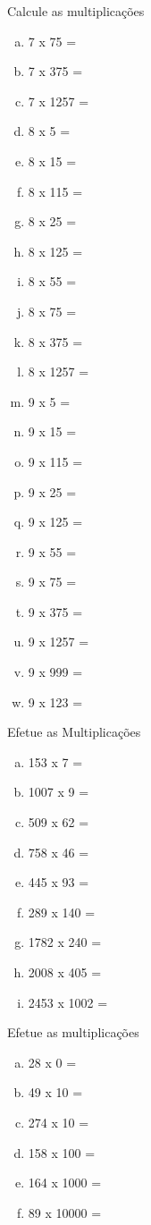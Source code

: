 \item Calcule as multiplicações
\begin{multicols}{3}
\begin{enumerate}[a)]
	\item 7 x 75 =
	\item 7 x 375 =
	\item 7 x 1257 =
	\item 8 x 5 =
	\item 8 x 15 = 
	\item 8 x 115 =
	\item 8 x 25 =
	\item 8 x 125 =
	\item 8 x 55 =
	\item 8 x 75 =
	\item 8 x 375 =
	\item 8 x 1257 =
	\item 9 x 5 =
	\item 9 x 15 =
	\item 9 x 115 =
	\item 9 x 25 =
	\item 9 x 125 =
	\item 9 x 55 =
	\item 9 x 75 =
	\item 9 x 375 =
	\item 9 x 1257 =
	\item 9 x 999 =
	\item 9 x 123 =
\end{enumerate}
\end{multicols}

\item Efetue as Multiplicações
\begin{multicols}{3}
\begin{enumerate}[a)]
	\item 153 x 7 =
	\item 1007 x 9 =
	\item 509 x 62 =
	\item 758 x 46 =
	\item 445 x 93 =
	\item 289 x 140 =
	\item 1782 x 240 =
	\item 2008 x 405 =
	\item 2453 x 1002 =
\end{enumerate}
\end{multicols}

\item Efetue as multiplicações
\begin{multicols}{3}
\begin{enumerate}[a)]
	\item 28 x 0 =
	\item 49 x 10 =
	\item 274 x 10 =
	\item 158 x 100 =
	\item 164 x 1000 =
	\item 89 x 10000 =
\end{enumerate}
\end{multicols}

